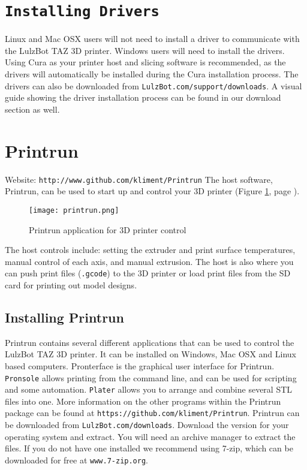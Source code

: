 \section{\texttt{Installing Drivers}}
Linux and Mac OSX users will not need to install a driver to communicate with the LulzBot\textsuperscript{\miniscule{\texttrademark}} TAZ 3D printer. Windows users will need to install the drivers. Using Cura as your printer host and slicing software is recommended, as the drivers will automatically be installed during the Cura installation process. The drivers can also be downloaded from \texttt{LulzBot.com/support/downloads}. A visual guide showing the driver installation process can be found in our download section as well.




\newpage
\section{Printrun}
\label{Printrun}
Website: \texttt{http://www.github.com/kliment/Printrun}
The host software, Printrun, can be used to start up and control your 3D printer (Figure \ref{fig:Printrun}, page \pageref{fig:Printrun}).
\begin{figure}[hbt]
\centering
\texttt{[image: printrun.png]}
\caption{Printrun application for 3D printer control}
\label{fig:Printrun}
\end{figure}
The host controls include: setting the extruder and print surface temperatures, manual control of each axis, and manual extrusion. The host is also where you can push print files (\texttt{.gcode}) to the 3D printer or load print files from the SD card for printing out model designs.

\subsection{Installing Printrun}
Printrun contains several different applications that can be used to control the LulzBot\textsuperscript{\miniscule{\texttrademark}} TAZ 3D printer. It can be installed on Windows, Mac OSX and Linux based computers. Pronterface is the graphical user interface for Printrun. \texttt{Pronsole} allows printing from the command line, and can be used for scripting and some automation. \texttt{Plater} allows you to arrange and combine several STL files into one. More information on the other programs within the Printrun package can be found at \texttt{https://github.com/kliment/Printrun}. Printrun can be downloaded from \texttt{LulzBot.com/downloads}. Download the version for your operating system and extract. You will need an archive manager to extract the files. If you do not have one installed we recommend using 7-zip, which can be downloaded for free at \texttt{www.7-zip.org}.

